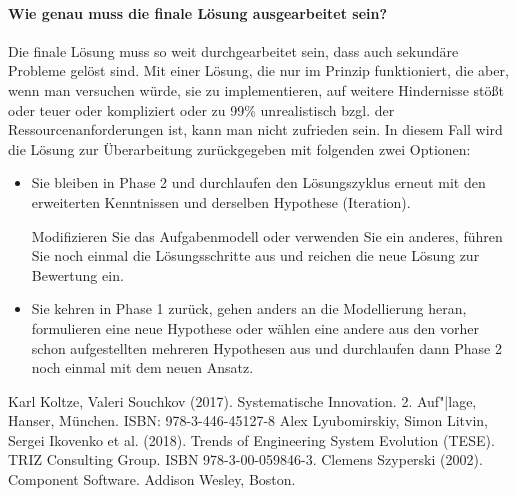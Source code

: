 \documentclass[11pt,a4paper]{article}
\begin{document}
\paragraph{Wie genau muss die finale Lösung ausgearbeitet sein?}
Die finale Lösung muss so weit durchgearbeitet sein, dass auch sekundäre
Probleme gelöst sind.  Mit einer Lösung, die nur im Prinzip funktioniert, die
aber, wenn man versuchen würde, sie zu implementieren, auf weitere Hindernisse
stößt oder teuer oder kompliziert oder zu 99\% unrealistisch bzgl. der
Ressourcenanforderungen ist, kann man nicht zufrieden sein.  In diesem Fall
wird die Lösung zur Überarbeitung zurückgegeben mit folgenden zwei Optionen:
\begin{itemize}
\item Sie bleiben in Phase 2 und durchlaufen den Lösungszyklus erneut mit den
  erweiterten Kenntnissen und derselben Hypothese (Iteration).
  
  Modifizieren Sie das Aufgabenmodell oder verwenden Sie ein anderes, führen
  Sie noch einmal die Lösungsschritte aus und reichen die neue Lösung zur
  Bewertung ein.
\item Sie kehren in Phase 1 zurück, gehen anders an die Modellierung heran,
  formulieren eine neue Hypothese oder wählen eine andere aus den vorher
  schon aufgestellten mehreren Hypothesen aus und durchlaufen dann Phase 2
  noch einmal mit dem neuen  Ansatz.
\end{itemize}


\begin{thebibliography}{xxx}
 Karl Koltze, Valeri Souchkov (2017). Systematische
  Innovation.  2. Auf"|lage, Hanser, München.  ISBN: 978-3-446-45127-8
 Alex Lyubomirskiy, Simon Litvin, Sergei Ikovenko et al.
  (2018).  Trends of Engineering System Evolution (TESE).  TRIZ Consulting
  Group. ISBN 978-3-00-059846-3.
 Clemens Szyperski (2002). Component Software. Addison
  Wesley, Boston. 
\end{thebibliography}
\end{document}
